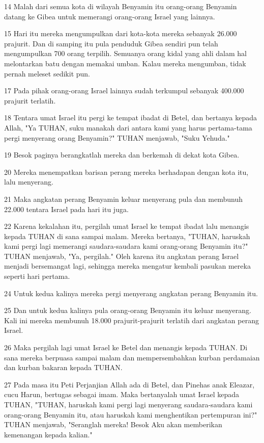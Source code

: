 \par 14 Malah dari semua kota di wilayah Benyamin itu orang-orang Benyamin datang ke Gibea untuk memerangi orang-orang Israel yang lainnya.
\par 15 Hari itu mereka mengumpulkan dari kota-kota mereka sebanyak 26.000 prajurit. Dan di samping itu pula penduduk Gibea sendiri pun telah mengumpulkan 700 orang terpilih. Semuanya orang kidal yang ahli dalam hal melontarkan batu dengan memakai umban. Kalau mereka mengumban, tidak pernah meleset sedikit pun.
\par 17 Pada pihak orang-orang Israel lainnya sudah terkumpul sebanyak 400.000 prajurit terlatih.
\par 18 Tentara umat Israel itu pergi ke tempat ibadat di Betel, dan bertanya kepada Allah, "Ya TUHAN, suku manakah dari antara kami yang harus pertama-tama pergi menyerang orang Benyamin?" TUHAN menjawab, "Suku Yehuda."
\par 19 Besok paginya berangkatlah mereka dan berkemah di dekat kota Gibea.
\par 20 Mereka menempatkan barisan perang mereka berhadapan dengan kota itu, lalu menyerang.
\par 21 Maka angkatan perang Benyamin keluar menyerang pula dan membunuh 22.000 tentara Israel pada hari itu juga.
\par 22 Karena kekalahan itu, pergilah umat Israel ke tempat ibadat lalu menangis kepada TUHAN di sana sampai malam. Mereka bertanya, "TUHAN, haruskah kami pergi lagi memerangi saudara-saudara kami orang-orang Benyamin itu?" TUHAN menjawab, "Ya, pergilah." Oleh karena itu angkatan perang Israel menjadi bersemangat lagi, sehingga mereka mengatur kembali pasukan mereka seperti hari pertama.
\par 24 Untuk kedua kalinya mereka pergi menyerang angkatan perang Benyamin itu.
\par 25 Dan untuk kedua kalinya pula orang-orang Benyamin itu keluar menyerang. Kali ini mereka membunuh 18.000 prajurit-prajurit terlatih dari angkatan perang Israel.
\par 26 Maka pergilah lagi umat Israel ke Betel dan menangis kepada TUHAN. Di sana mereka berpuasa sampai malam dan mempersembahkan kurban perdamaian dan kurban bakaran kepada TUHAN.
\par 27 Pada masa itu Peti Perjanjian Allah ada di Betel, dan Pinehas anak Eleazar, cucu Harun, bertugas sebagai imam. Maka bertanyalah umat Israel kepada TUHAN, "TUHAN, haruskah kami pergi lagi menyerang saudara-saudara kami orang-orang Benyamin itu, atau haruskah kami menghentikan pertempuran ini?" TUHAN menjawab, "Seranglah mereka! Besok Aku akan memberikan kemenangan kepada kalian."
